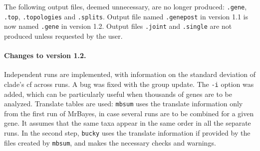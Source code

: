 \documentclass[12pt,english,final,letterpaper]{article}
\begin{document}
\smallskip

The following output files, deemed unnecessary, are no longer produced:
{\tt .gene}, {\tt .top}, {\tt .topologies} and {\tt .splits}. 
Output file named {\tt .genepost} in version 1.1 is now named 
{\tt .gene} in version 1.2. 
Output files {\tt .joint} and {\tt .single} are not produced unless
requested by the user.

\paragraph{Changes to version 1.2.}
Independent runs are implemented, with information on the standard deviation
of clade's {\sc cf} across runs. A bug was fixed with the group update.
The {\tt -i} option was added, which can be particularly useful when
thousands of genes are to be analyzed. Translate tables are used: {\tt mbsum}
uses the translate information only from the first run of MrBayes,
in case several runs are to be combined for a given gene. It assumes
that the same taxa appear in the same order in all the separate runs.
In the second step, {\tt bucky} uses the translate information if provided 
by the files created by {\tt mbsum}, and makes the necessary checks and
warnings.
\end{document}
